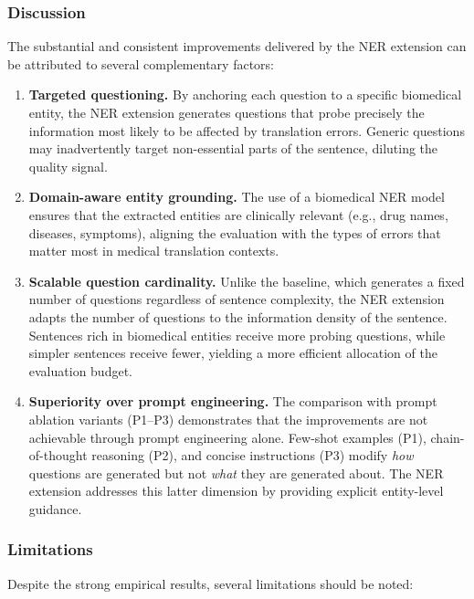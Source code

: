 \subsubsection{Discussion}

The substantial and consistent improvements delivered by the NER extension can be attributed to several complementary factors:

\begin{enumerate}
    \item \textbf{Targeted questioning.} By anchoring each question to a specific biomedical entity, the NER extension generates questions that probe precisely the information most likely to be affected by translation errors. Generic questions may inadvertently target non-essential parts of the sentence, diluting the quality signal.
    
    \item \textbf{Domain-aware entity grounding.} The use of a biomedical NER model ensures that the extracted entities are clinically relevant (e.g., drug names, diseases, symptoms), aligning the evaluation with the types of errors that matter most in medical translation contexts.
    
    \item \textbf{Scalable question cardinality.} Unlike the baseline, which generates a fixed number of questions regardless of sentence complexity, the NER extension adapts the number of questions to the information density of the sentence. Sentences rich in biomedical entities receive more probing questions, while simpler sentences receive fewer, yielding a more efficient allocation of the evaluation budget.
    
    \item \textbf{Superiority over prompt engineering.} The comparison with prompt ablation variants (P1--P3) demonstrates that the improvements are not achievable through prompt engineering alone. Few-shot examples (P1), chain-of-thought reasoning (P2), and concise instructions (P3) modify \textit{how} questions are generated but not \textit{what} they are generated about. The NER extension addresses this latter dimension by providing explicit entity-level guidance.
\end{enumerate}

\subsubsection{Limitations}

Despite the strong empirical results, several limitations should be noted:

